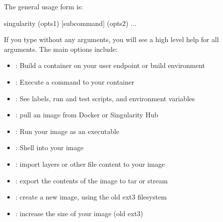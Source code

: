 \documentclass[letterpaper,10pt,english]{sphinxmanual}
\begin{document}
The general usage form is:

%
\begin{sphinxVerbatim}[commandchars=\\\{\}]
\PYGZdl{} singularity (opts1) [subcommand] (opts2) ...
\end{sphinxVerbatim}

If you type  without any arguments, you will see a high
level help for all arguments. The main options include:
\begin{itemize}
\item {} 
{\hyperref[\detokenize{appendix:build-command}]{}} : Build a container on your user endpoint or build environment

\item {} 
{\hyperref[\detokenize{appendix:exec-command}]{}} : Execute a command to your container

\item {} 
{\hyperref[\detokenize{appendix:inspect-command}]{}} : See labels, run and test scripts, and environment variables

\item {} 
{\hyperref[\detokenize{appendix:pull-command}]{}} : pull an image from Docker or Singularity Hub

\item {} 
{\hyperref[\detokenize{appendix:run-command}]{}} : Run your image as an executable

\item {} 
{\hyperref[\detokenize{appendix:shell-command}]{}} : Shell into your image

\end{itemize}

\begin{itemize}
\item {} 
{\hyperref[\detokenize{appendix:image-import}]{}} : import layers or other file content to your image

\item {} 
{\hyperref[\detokenize{appendix:image-export}]{}} : export the contents of the image to tar or stream

\item {} 
{\hyperref[\detokenize{appendix:image-create}]{}} : create a new image, using the old ext3 filesystem

\item {} 
{\hyperref[\detokenize{appendix:image-expand}]{}} : increase the size of your image (old ext3)

\end{itemize}
\end{document}
